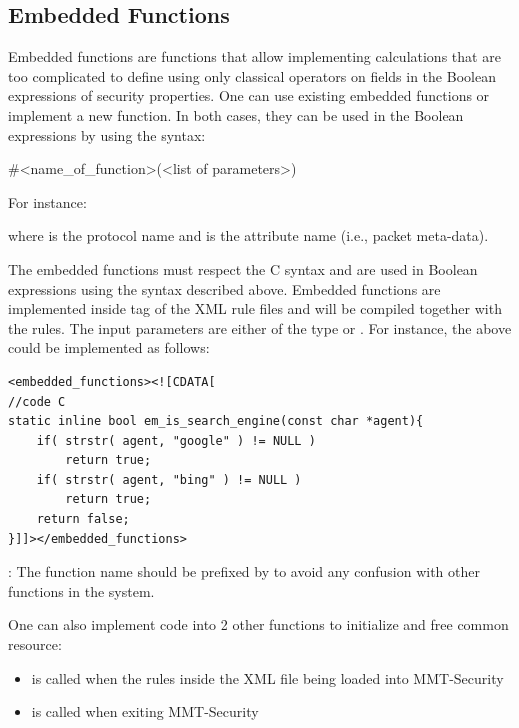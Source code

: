 
\subsection{Embedded Functions}
\label{Embedded}
Embedded functions are functions that allow implementing calculations that are too complicated to define using only classical operators on fields in the Boolean expressions of security properties. One can use existing embedded functions or implement a new function. In both cases, they can be used in the Boolean expressions by using the syntax:

\#<name\_of\_function>(<list of parameters>)

For instance:


where  is the protocol name and  is the attribute name (i.e., packet meta-data).

The embedded functions must respect the C syntax and are used in Boolean expressions using the syntax described above.
Embedded functions are implemented inside  tag of the XML rule files and will be compiled together with the rules. 
The input parameters are either of the type  or . 
For instance, the  above could be implemented as follows:

\begin{lstlisting}[style=Cpp]
<embedded_functions><![CDATA[
//code C
static inline bool em_is_search_engine(const char *agent){
    if( strstr( agent, "google" ) != NULL )
        return true;
    if( strstr( agent, "bing" ) != NULL )
        return true;
    return false;
}]]></embedded_functions>
\end{lstlisting}

\note: The function name should be prefixed by  to avoid any confusion with other functions in the system.

One can also implement code into 2 other functions to initialize and free common resource:
\begin{itemize}
    \item {} is called when the rules inside the XML file being loaded into MMT-Security

    \item {} is called when exiting MMT-Security
\end{itemize}


